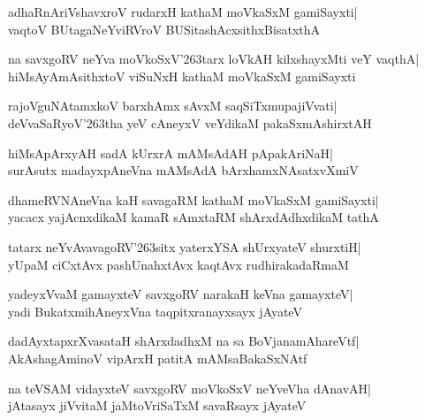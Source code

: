 \documentclass[twoside,12pt,openright]{book}
\def\S{\char'263}
\newcounter{shloka}[chapter]
\begin{document}
\begin{shloka}%
adhaRnAriVshavxroV rudarxH kathaM moVkaSxM gamiSayxti|\\
vaqtoV BUtagaNeYviRVroV BUSitashAcxsithxBisatxthA
\end{shloka}

\begin{shloka}%
na savxgoRV neYva moVkoSxV\S tarx loVkAH kilxshayxMti veY vaqthA|\\
hiMsAyAmAsithxtoV viSuNxH kathaM moVkaSxM gamiSayxti
\end{shloka}

\begin{shloka}%
rajoVguNAtamxkoV barxhAmx sAvxM saqSiTxmupajiVvati|\\
deVvaSaRyoV\S tha yeV cAneyxV veYdikaM pakaSxmAshirxtAH
\end{shloka}

\begin{shloka}%
hiMsApArxyAH sadA kUrxrA mAMsAdAH pApakAriNaH|\\
surAsutx madayxpAneVna mAMsAdA bArxhamxNAsatxvXmiV
\end{shloka}

\begin{shloka}%
dhameRVNAneVna kaH savagaRM kathaM moVkaSxM gamiSayxti|\\
yacacx yajAcnxdikaM kamaR sAmxtaRM shArxdAdhxdikaM tathA
\end{shloka}

\begin{shloka}%
tatarx neYvAvavagoRV\S sitx yaterxYSA shUrxyateV shurxtiH|\\
yUpaM ciCxtAvx pashUnahxtAvx kaqtAvx rudhirakadaRmaM
\end{shloka}

\begin{shloka}%
yadeyxVvaM gamayxteV savxgoRV narakaH keVna gamayxteV|\\
yadi BukatxmihAneyxVna taqpitxranayxsayx jAyateV
\end{shloka}

\begin{shloka}%
dadAyxtapxrXvasataH shArxdadhxM na sa BoVjanamAhareVtf|\\
AkAshagAminoV vipArxH patitA mAMsaBakaSxNAtf
\end{shloka}

\begin{shloka}%
na teVSAM vidayxteV savxgoRV moVkoSxV neYveVha dAnavAH|\\
jAtasayx jiVvitaM jaMtoVriSaTxM savaRsayx jAyateV
\end{shloka}
\end{document}
